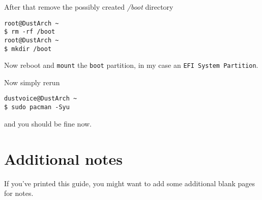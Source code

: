 \documentclass[9pt]{report}
\begin{document}
After that remove the possibly created \textit{/boot} directory


\begin{verbatim}
root@DustArch ~
$ rm -rf /boot
root@DustArch ~
$ mkdir /boot
\end{verbatim}

Now reboot and \texttt{mount} the \texttt{boot} partition, in my case an \texttt{EFI System Partition}.


Now simply rerun


\begin{verbatim}
dustvoice@DustArch ~
$ sudo pacman -Syu
\end{verbatim}

and you should be fine now.


\hypertarget{x-additional-notes}{\chapter{Additional notes}}
If you’ve printed this guide, you might want to add some additional blank pages for notes.
\end{document}

